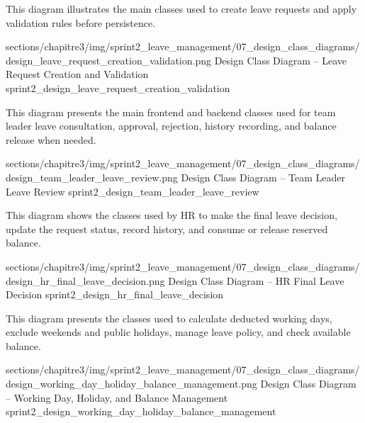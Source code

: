 \Needspace{8.5cm}

\noindent This diagram illustrates the main classes used to create leave requests and apply validation rules before persistence.\par

\ChapterThreeFigure
{sections/chapitre3/img/sprint2_leave_management/07_design_class_diagrams/design_leave_request_creation_validation.png}
{Design Class Diagram -- Leave Request Creation and Validation}
{sprint2_design_leave_request_creation_validation}

\Needspace{8.5cm}

\noindent This diagram presents the main frontend and backend classes used for team leader leave consultation, approval, rejection, history recording, and balance release when needed.\par

\ChapterThreeFigure
{sections/chapitre3/img/sprint2_leave_management/07_design_class_diagrams/design_team_leader_leave_review.png}
{Design Class Diagram -- Team Leader Leave Review}
{sprint2_design_team_leader_leave_review}

\Needspace{8.5cm}

\noindent This diagram shows the classes used by HR to make the final leave decision, update the request status, record history, and consume or release reserved balance.\par

\ChapterThreeFigure
{sections/chapitre3/img/sprint2_leave_management/07_design_class_diagrams/design_hr_final_leave_decision.png}
{Design Class Diagram -- HR Final Leave Decision}
{sprint2_design_hr_final_leave_decision}

\Needspace{8.5cm}

\noindent This diagram presents the classes used to calculate deducted working days, exclude weekends and public holidays, manage leave policy, and check available balance.\par

\ChapterThreeFigure
{sections/chapitre3/img/sprint2_leave_management/07_design_class_diagrams/design_working_day_holiday_balance_management.png}
{Design Class Diagram -- Working Day, Holiday, and Balance Management}
{sprint2_design_working_day_holiday_balance_management}

